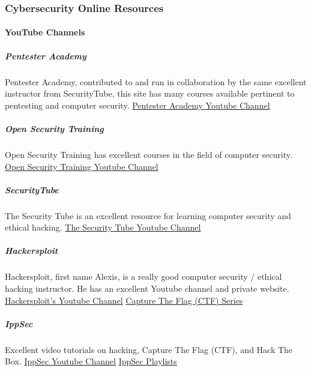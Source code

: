\subsubsection{Cybersecurity Online Resources}

\paragraph{YouTube Channels}

\subparagraph{Pentester Academy}

Pentester Academy, contributed to and run in collaboration by the same excellent instructor from SecurityTube, this site has many courses available pertinent to pentesting and computer security.\newline
\href{https://www.youtube.com/channel/UChjC1q6Ami7W0E71TzPZELA}{Pentester Academy Youtube Channel}

\subparagraph{Open Security Training}

Open Security Training has excellent courses in the field of computer security.\newline
\href{https://www.youtube.com/user/OpenSecurityTraining}{Open Security Training Youtube Channel}

\subparagraph{SecurityTube}

The Security Tube is an excellent resource for learning computer security and ethical hacking.\newline
\href{https://www.youtube.com/user/TheSecurityTube}{The Security Tube Youtube Channel}

\subparagraph{Hackersploit}

Hackersploit, first name Alexis, is a really good computer security / ethical hacking instructor. He has an excellent Youtube channel and private website.\newline
\href{https://www.youtube.com/channel/UC0ZTPkdxlAKf-V33tqXwi3Q/featured}{Hackersploit's Youtube Channel}\newline
\href{https://www.youtube.com/playlist?list=PLBf0hzazHTGOyRReqMyE-CDMWAQ5AgXO-}{Capture The Flag (CTF) Series}

\subparagraph{IppSec}

Excellent video tutorials on hacking, Capture The Flag (CTF), and Hack The Box.\newline
\href{https://www.youtube.com/channel/UCa6eh7gCkpPo5XXUDfygQQA}{IppSec Youtube Channel}\newline
\href{https://www.youtube.com/channel/UCa6eh7gCkpPo5XXUDfygQQA/playlists}{IppSec Playlists}

